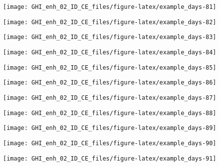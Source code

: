 \documentclass[
  10pt,
  a4paper,oneside]{article}
\begin{document}
\begin{center}\texttt{[image: GHI\_enh\_02\_ID\_CE\_files/figure-latex/example\_days-81]} \end{center}

\begin{center}\texttt{[image: GHI\_enh\_02\_ID\_CE\_files/figure-latex/example\_days-82]} \end{center}

\begin{center}\texttt{[image: GHI\_enh\_02\_ID\_CE\_files/figure-latex/example\_days-83]} \end{center}

\begin{center}\texttt{[image: GHI\_enh\_02\_ID\_CE\_files/figure-latex/example\_days-84]} \end{center}

\begin{center}\texttt{[image: GHI\_enh\_02\_ID\_CE\_files/figure-latex/example\_days-85]} \end{center}

\begin{center}\texttt{[image: GHI\_enh\_02\_ID\_CE\_files/figure-latex/example\_days-86]} \end{center}

\begin{center}\texttt{[image: GHI\_enh\_02\_ID\_CE\_files/figure-latex/example\_days-87]} \end{center}

\begin{center}\texttt{[image: GHI\_enh\_02\_ID\_CE\_files/figure-latex/example\_days-88]} \end{center}

\begin{center}\texttt{[image: GHI\_enh\_02\_ID\_CE\_files/figure-latex/example\_days-89]} \end{center}

\begin{center}\texttt{[image: GHI\_enh\_02\_ID\_CE\_files/figure-latex/example\_days-90]} \end{center}

\begin{center}\texttt{[image: GHI\_enh\_02\_ID\_CE\_files/figure-latex/example\_days-91]} \end{center}
\end{document}
